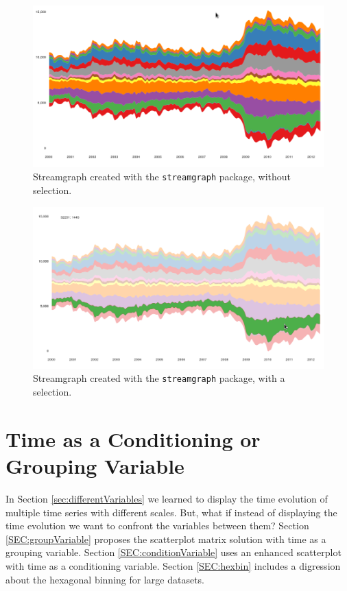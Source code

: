 \documentclass[smallroyalvopaper]{memoir}
\begin{document}
\begin{figure}[htbp]
\centering
\includegraphics[width=.9\linewidth]{figs/streamgraph_interactive.png}
\caption{Streamgraph created with the \texttt{streamgraph} package, without selection. \label{fig:streamgraph_interactive}}
\end{figure}

\begin{figure}[htbp]
\centering
\includegraphics[width=.9\linewidth]{figs/streamgraph_interactive_selected.png}
\caption{Streamgraph created with the \texttt{streamgraph} package, with a selection. \label{fig:streamgraph_interactive_selected}}
\end{figure}

\chapter{Time as a Conditioning or Grouping Variable}
\label{sec:orgad3a3ab}
\label{cha:timeGroupFactor}

In Section \ref{sec:differentVariables} we learned to display the time evolution of multiple time series with different scales. But, what if instead of displaying the time evolution we want to confront the variables between them? Section \ref{SEC:groupVariable} proposes the scatterplot matrix solution with time as a grouping variable. Section \ref{SEC:conditionVariable} uses an enhanced scatterplot with time as a conditioning variable. Section \ref{SEC:hexbin} includes a digression about the hexagonal binning for large datasets.
\end{document}
